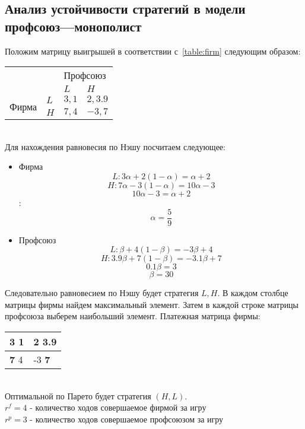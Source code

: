 \subsection{Анализ устойчивости стратегий в модели профсоюз---монополист}
Положим матрицу выигрышей в соответствии с~\ref{table:firm} следующим образом:
\begin{table}[h]
	
	\centering
	\begin{tabular}{|l|l|l|l|}
		\hline
		\multicolumn{2}{|l|}{\multirow{2}{*}{}} & \multicolumn{2}{l|}{Профсоюз} \\ \cline{3-4} 
		\multicolumn{2}{|l|}{}                  & $L$            & $H$            \\ \hline
		\multirow{2}{*}{Фирма}     & $L$     & $3, 1$          & $2, 3.9$          \\ \cline{2-4} 
		& $H$     & $7, 4$          & $-3, 7$          \\ \hline
	\end{tabular}
	
\end{table}\\
Для нахождения равновесия по Нэшу посчитаем следующее: 
\begin{itemize}
\item Фирма
	$$ L:  3\alpha + 2(1-\alpha)=\alpha + 2$$
	$$ H: 7\alpha - 3(1-\alpha)=10\alpha - 3$$
	$$10\alpha - 3 = \alpha+2 $$:
	$$\alpha = \frac{5}{9} $$
\item Профсоюз	
	 $$L: \beta + 4(1-\beta)=-3\beta + 4$$
	 $$H: 3.9\beta + 7(1-\beta)=-3.1\beta +7$$
	$$0.1\beta  = 3 $$
	$$\beta = 30 $$
	
	
\end{itemize}

Следовательно равновесием по Нэшу будет стратегия $L,H$.
\newpage
В каждом столбце матрицы фирмы найдем максимальный элемент. 
Затем в каждой строке матрицы профсоюза выберем наибольший элемент.
Платежная матрица фирмы:\\
\begin{table}[h]
	\centering
	\begin{tabular}{|l|l|}
		\hline
		3 1 & \textbf{2 3.9}  \\ \hline
		\textbf{7} 4 & -3 \textbf{7} \\ \hline
	\end{tabular}
\end{table}\\
Оптимальной по Парето будет стратегия $(H,L)$.\\
$r^f= 4 $ - количество ходов совершаемое фирмой за игру\\
$r^p= 3 $ - количество ходов совершаемое профсоюзом за игру\\ \\

